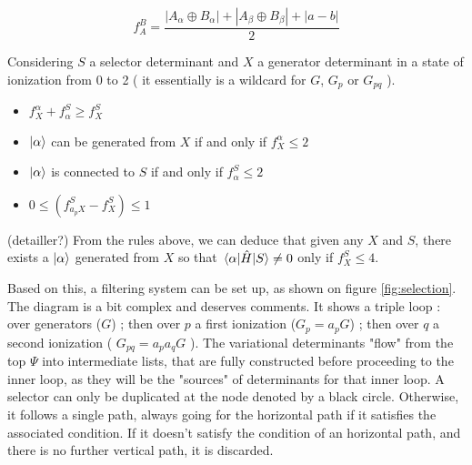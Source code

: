 \documentclass[./thesis.tex]{subfiles}
\begin{document}
%

%


\begin{equation}
f_A^B = \frac{|A_\alpha \oplus B_\alpha| + |A_\beta \oplus B_\beta| + |a-b|}{2}
\end{equation}


Considering $S$ a selector determinant and $X$ a generator determinant in a state of ionization from 0 to 2 ( it essentially is a wildcard for $G$, $G_p$ or $G_{pq}$ ).

\begin{itemize}
\item
$f_X^\alpha + f_\alpha^S \geq f_X^S$
\item
$\ket \alpha$ can be generated from $X$ if and only if $f_X^\alpha \leq 2$
\item
$\ket \alpha$ is connected to $S$ if and only if $f_\alpha^S \leq 2$
\item
$0 \leq (f_{a_p X}^S - f_X^S) \leq 1$
\end{itemize}

(detailler?)
From the rules above, we can deduce that given any $X$ and $S$, there exists a $\ket \alpha$ generated from $X$ so that $\mel{\alpha}{\hat{H}}{S} \neq 0$ only if $f_X^S \leq 4$.

Based on this, a filtering system can be set up, as shown on figure \ref{fig:selection}.\\

The diagram is a bit complex and deserves comments. 
It shows a triple loop : over generators ($G$) ; then over $p$ a first ionization ($G_p = a_p G$) ; then over $q$ a second ionization ( $G_{pq} = a_p a_q G$ ). The variational determinants "flow" from the top $\Psi$ into intermediate lists, that are fully constructed before proceeding to the inner loop, as they will be the "sources" of determinants for that inner loop.
A selector can only be duplicated at the node denoted by a black circle. Otherwise, it follows a single path, always going for the horizontal path if it satisfies the associated condition.
If it doesn't satisfy the condition of an horizontal path, and there is no further vertical path, it is discarded.
\end{document}
